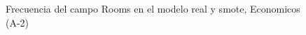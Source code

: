 \begin{figure}[H]
    \centering
    
    \caption{Frecuencia del campo Rooms en el modelo real y smote, Economicos (A-2)}
    \label{frecuency-Rooms-smote-enc}
\end{figure}